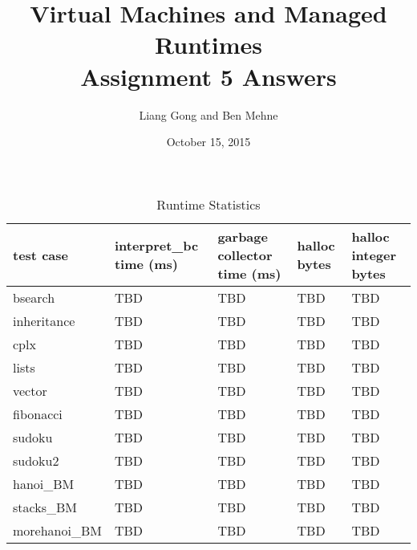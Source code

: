 \documentclass[notitlepage]{report}
\title{\vspace{-0.5in}Virtual Machines and Managed Runtimes \\ Assignment 5 Answers}
\date{\vspace{-0.5in}October 15, 2015}
\author{\vspace{-0.5in}Liang Gong and Ben Mehne\vspace{-0.5in}}
\newcommand{\code}[1]{{\ttfamily #1}}
\begin{document}
\maketitle

\begin{table}[!htp]
\centering
\caption{Runtime Statistics}
\label{statistics}
{\footnotesize
\begin{tabular}{lllll}
\toprule
test case & interpret\_bc time (ms) & garbage collector time (ms) & \code{halloc} bytes & \code{halloc} integer bytes \\
\midrule
bsearch        & TBD          & TBD          & TBD          & TBD     \\
inheritance    & TBD          & TBD          & TBD          & TBD     \\
cplx           & TBD          & TBD          & TBD          & TBD     \\
lists          & TBD          & TBD          & TBD          & TBD     \\
vector         & TBD          & TBD          & TBD          & TBD     \\
fibonacci      & TBD          & TBD          & TBD          & TBD     \\
sudoku         & TBD          & TBD          & TBD          & TBD     \\
sudoku2        & TBD          & TBD          & TBD          & TBD     \\
hanoi\_BM      & TBD          & TBD          & TBD          & TBD     \\
stacks\_BM     & TBD          & TBD          & TBD          & TBD     \\
morehanoi\_BM  & TBD          & TBD          & TBD          & TBD     \\
\bottomrule
\end{tabular}
}
\end{table}
\end{document}

